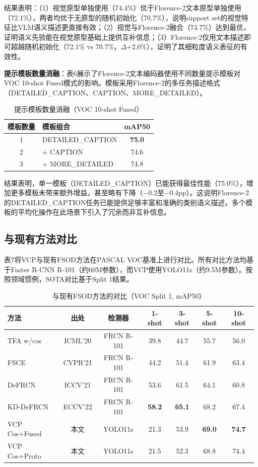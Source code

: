 \documentclass[zihao=5,a4paper,twocolumn]{ctexart}
\begin{document}
结果表明：（1）视觉原型单独使用（74.4\%）优于Florence-2文本原型单独使用（72.1\%），两者均优于无原型的随机初始化（70.7\%），说明support set的视觉特征比VLM语义描述更直接有效；（2）视觉与Florence-2融合（74.7\%）达到最优，证明语义先验能在视觉原型基础上提供互补信息；（3）Florence-2仅用文本描述即可超越随机初始化（72.1\% vs 70.7\%，$\Delta$+2.0\%），证明了其细粒度语义表征的有效性。

\textbf{提示模板数量消融}：表6展示了Florence-2文本编码器使用不同数量提示模板对VOC 10-shot Fused模式的影响。模板采用Florence-2的多任务描述格式（DETAILED\_CAPTION、CAPTION、MORE\_DETAILED）。

\begin{table}[ht]
\centering
\caption{提示模板数量消融（VOC 10-shot Fused）}
\label{tab:prompt_ablation}
\begin{tabular}{clc}
\toprule
模板数量 & 模板组合 & mAP50 \\
\midrule
1 & DETAILED\_CAPTION & \textbf{75.0} \\
2 & + CAPTION            & 74.6 \\
3 & + MORE\_DETAILED      & 74.8 \\
\bottomrule
\end{tabular}
\end{table}

结果表明，单一模板（DETAILED\_CAPTION）已能获得最佳性能（75.0\%），增加更多模板未带来额外增益，甚至略有下降（$-$0.2至$-$0.4pp）。这说明Florence-2的DETAILED\_CAPTION任务已能提供足够丰富和准确的类别语义描述，多个模板的平均化操作在此场景下引入了冗余而非互补信息。

\subsection{与现有方法对比}

表7将VCP与现有FSOD方法在PASCAL VOC基准上进行对比。所有对比方法均基于Faster R-CNN R-101（约60M参数），而VCP使用YOLO11s（约9.5M参数）。按照领域惯例，SOTA对比基于Split 1结果。

\begin{table}[t]
\centering
\caption{与现有FSOD方法的对比（VOC Split 1, mAP50）}
\label{tab:sota}
\begin{tabular}{lcccccc}
\toprule
方法 & 出处 & 检测器 & 1-shot & 3-shot & 5-shot & 10-shot \\
\midrule
TFA w/cos      & ICML'20 & FRCN R-101 & 39.8 & 44.7 & 55.7 & 56.0 \\
FSCE           & CVPR'21 & FRCN R-101 & 44.2 & 51.4 & 61.9 & 63.4 \\
DeFRCN         & ICCV'21 & FRCN R-101 & 53.6 & 61.5 & 64.1 & 60.8 \\
KD-DeFRCN      & ECCV'22 & FRCN R-101 & \textbf{58.2} & \textbf{65.1} & 68.2 & 67.4 \\
\midrule
VCP Cos+Fused  & 本文    & YOLO11s    & 21.3 & 53.9 & \textbf{69.0} & \textbf{74.7} \\
VCP Cos+Proto  & 本文    & YOLO11s    & 21.5 & 52.3 & 68.8 & 74.4 \\
\bottomrule
\end{tabular}
\end{table}
\end{document}
